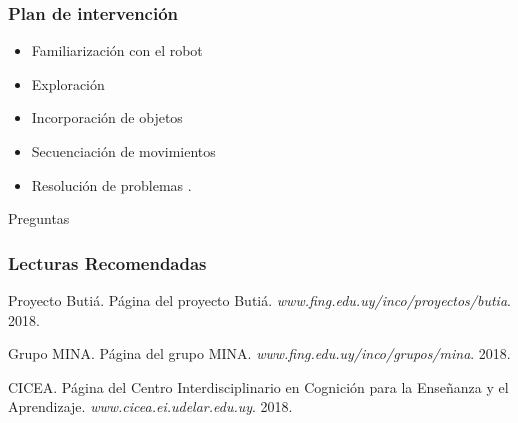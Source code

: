 \documentclass[spanish]{beamer}
\begin{document}
 \begin{frame}
 	\frametitle{Plan de intervención}
 	\begin{itemize}
 		\item Familiarización con el robot
 		\item Exploración
 		\item Incorporación de objetos
 		\item Secuenciación de movimientos
 		\item Resolución de problemas	.
 	\end{itemize}
 \end{frame}
 
\begin{frame}	
\Huge{\centerline{Preguntas}}
\end{frame}


\begin{frame}
\frametitle{Lecturas Recomendadas}
\footnotesize{

\begin{thebibliography}{99} %
 Proyecto Butiá.
\newblock Página del proyecto Butiá.
\newblock\emph{www.fing.edu.uy/inco/proyectos/butia}. 2018.

 Grupo MINA.
\newblock Página del grupo MINA.
\newblock\emph{www.fing.edu.uy/inco/grupos/mina}. 2018.

 CICEA.
\newblock Página del Centro Interdisciplinario en Cognición para la Enseñanza y el Aprendizaje.
\newblock\emph{www.cicea.ei.udelar.edu.uy}. 2018.

\end{thebibliography}
}
\end{frame}

\end{document}
